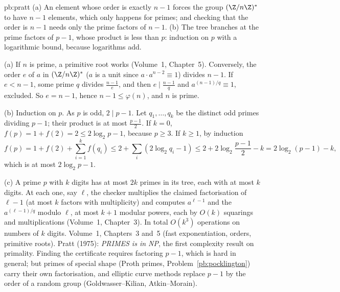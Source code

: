 \begin{solution}{pb:pratt}
\idea (a) An element whose order is exactly $n-1$ forces the group $(\Z/n\Z)^*$ to have $n-1$ elements, which only happens
for primes; and checking that the order is $n-1$ needs only the prime factors of $n-1$. (b) The tree branches at the prime
factors of $p-1$, whose product is less than $p$: induction on $p$ with a logarithmic bound, because logarithms add.

\writeup (a) If $n$ is prime, a primitive root works (Volume~1, Chapter~5). Conversely, the order $e$ of $a$ in $(\Z/n\Z)^*$ ($a$ is a
unit since $a\cdot a^{n-2}\equiv1$) divides $n-1$. If $e<n-1$, some prime $q$ divides $\frac{n-1}e$, and then $e\mid\frac{n-1}q$ and
$a^{(n-1)/q}\equiv1$, excluded. So $e=n-1$, hence $n-1\le\varphi(n)$, and $n$ is prime.

(b) Induction on $p$. As $p$ is odd, $2\mid p-1$. Let $q_1,\dots,q_k$ be the distinct odd primes dividing $p-1$; their product is at
most $\frac{p-1}2$. If $k=0$, $f(p)=1+f(2)=2\le2\log_2p-1$, because $p\ge3$. If $k\ge1$, by induction
\[
f(p)=1+f(2)+\sum_{i=1}^kf(q_i)\le2+\sum_i(2\log_2q_i-1)\le2+2\log_2\frac{p-1}2-k=2\log_2(p-1)-k,
\]
which is at most $2\log_2p-1$.

(c) A prime $p$ with $k$ digits has at most $2k$ primes in its tree, each with at most $k$ digits. At each one, say $\ell$, the
checker multiplies the claimed factorisation of $\ell-1$ (at most $k$ factors with multiplicity) and computes $a^{\ell-1}$ and the
$a^{(\ell-1)/q}$ modulo $\ell$, at most $k+1$ modular powers, each by $O(k)$ squarings and multiplications (Volume~1, Chapter~3). In
total $O(k^3)$ operations on numbers of $k$ digits.
\tools Volume~1, Chapters~3 and~5 (fast exponentiation, orders, primitive roots).
\leads Pratt (1975): \emph{PRIMES is in NP}, the first complexity result on primality. Finding the certificate requires factoring
$p-1$, which is hard in general; but primes of special shape (Proth primes, Problem~\ref{pb:pocklington}) carry their own
factorisation, and elliptic curve methods replace $p-1$ by the order of a random group (Goldwasser--Kilian, Atkin--Morain).
\end{solution}

